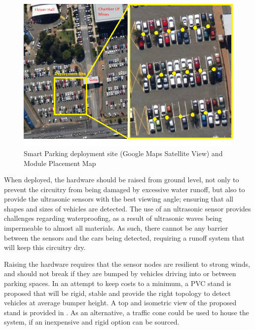 \documentclass[10pt,twocolumn]{witseiepaper}
\begin{document}
		\begin{figure}
			\centering
			\includegraphics[width=1\columnwidth]{media/deploymentSite.png}
			\caption{Smart Parking deployment site (Google Maps Satellite View) and Module Placement Map}
			\raggedright
			\label{fig:deployment}
		\end{figure}
	
		When deployed, the hardware should be raised from ground level, not only to prevent the circuitry from being damaged by excessive water runoff, but also to provide the ultrasonic sensors with the best viewing angle; ensuring that all shapes and sizes of vehicles are detected. The use of an ultrasonic sensor provides challenges regarding waterproofing, as a result of ultrasonic waves being impermeable to almost all materials. As such, there cannot be any barrier between the sensors and the cars being detected, requiring a runoff system that will keep this circuitry dry. 
		
		Raising the hardware requires that the sensor nodes are resilient to strong winds, and should not break if they are bumped by vehicles driving into or between parking spaces. In an attempt to keep costs to a minimum, a PVC stand is proposed that will be rigid, stable and provide the right topology to detect vehicles at average bumper height. A top and isometric view of the proposed stand is provided in . As an alternative, a traffic cone could be used to house the system, if an inexpensive and rigid option can be sourced.
		
\end{document}
